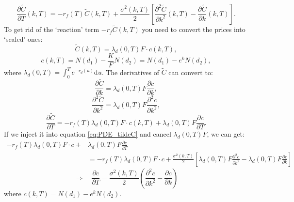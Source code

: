 \documentclass[12pt]{article}
\begin{document}
\begin{equation}\label{eq:PDE_tildeC}
    \frac{\partial \tilde{C}}{\partial T}(k,T)=-r_f(T)\tilde{C}(k,T)+\frac{\sigma^2(k,T)}{2}\left[\frac{\partial^2 \tilde{C}}{\partial k^2}(k,T)-\frac{\partial \tilde{C}}{\partial k}(k,T)\right].
\end{equation}
To get rid of the `reaction' term $-r_f\tilde{C}(k,T)$ you need to convert the prices into `scaled' ones:
\begin{equation}
    \tilde{C}(k,T)=\lambda_d(0,T)F\cdot c(k,T),
\end{equation}
\begin{equation}
    c(k,T)=N(d_1)-\frac{K}{F}N(d_2)=N(d_1)-e^kN(d_2),
\end{equation}
where $\lambda_d(0,T)=\int_0^T e^{-r_d(u)} \mathrm{d}u$.
The derivatives of $\tilde{C}$ can convert to:
\begin{equation}
    \frac{\partial \tilde{C}}{\partial k}=\lambda_d(0,T)F\frac{\partial c}{\partial k},
\end{equation}
\begin{equation}
    \frac{\partial^2 \tilde{C}}{\partial k^2}=\lambda_d(0,T)F\frac{\partial^2 c}{\partial k^2},
\end{equation}
\begin{equation}
    \frac{\partial \tilde{C}}{\partial T}=-r_f(T)\lambda_d(0,T)F\cdot c(k,T)+\lambda_d(0,T)F\frac{\partial c}{\partial T}.
\end{equation}
If we inject it into equation \ref{eq:PDE_tildeC} and cancel $\lambda_d(0,T)F$, we can get:
\begin{equation}
\begin{split}
    -r_f(T)\lambda_d(0,T)F\cdot c+&\lambda_d(0,T)F\frac{\partial c}{\partial T} \\
    &=-r_f(T)\lambda_d(0,T)F\cdot c+\frac{\sigma^2(k,T)}{2}\left[\lambda_d(0,T)F\frac{\partial^2 c}{\partial k^2}-\lambda_d(0,T)F\frac{\partial c}{\partial k}\right]
\end{split}
\end{equation}
\begin{equation}
    \Rightarrow \quad \frac{\partial c}{\partial T}=\frac{\sigma^2(k,T)}{2}\left(\frac{\partial^2 c}{\partial k^2}-\frac{\partial c}{\partial k}\right)
\end{equation}
where $c(k,T)=N(d_1)-e^kN(d_2)$.
\end{document}
